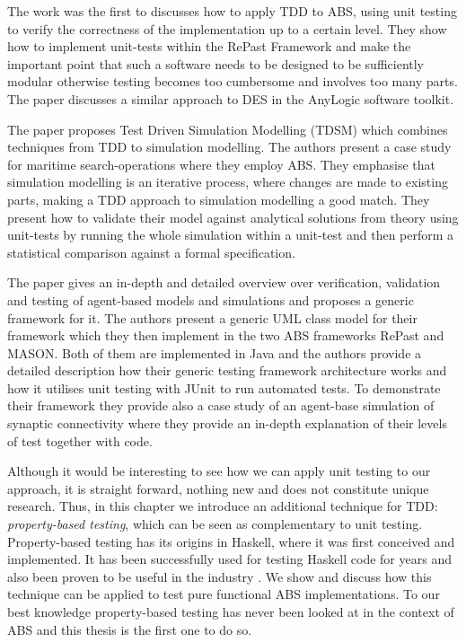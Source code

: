 \medskip

The work \cite{collier_test-driven_2013} was the first to discusses how to apply TDD to ABS, using unit testing to verify the correctness of the implementation up to a certain level. They show how to implement unit-tests within the RePast Framework \cite{north_complex_2013} and make the important point that such a software needs to be designed to be sufficiently modular otherwise testing becomes too cumbersome and involves too many parts. The paper \cite{asta_investigation_2014} discusses a similar approach to DES in the AnyLogic software toolkit. 

The paper \cite{onggo_test-driven_2016} proposes Test Driven Simulation Modelling (TDSM) which combines techniques from TDD to simulation modelling. The authors present a case study for maritime search-operations where they employ ABS. They emphasise that simulation modelling is an iterative process, where changes are made to existing parts, making a TDD approach to simulation modelling a good match. They present how to validate their model against analytical solutions from theory using unit-tests by running the whole simulation within a unit-test and then perform a statistical comparison against a formal specification. %

The paper \cite{gurcan_generic_2013} gives an in-depth and detailed overview over verification, validation and testing of agent-based models and simulations and proposes a generic framework for it. The authors present a generic UML class model for their framework which they then implement in the two ABS frameworks RePast and MASON. Both of them are implemented in Java and the authors provide a detailed description how their generic testing framework architecture works and how it utilises unit testing with JUnit to run automated tests. To demonstrate their framework they provide also a case study of an agent-base simulation of synaptic connectivity where they provide an in-depth explanation of their levels of test together with code.

\medskip

Although it would be interesting to see how we can apply unit testing to our approach, it is straight forward, nothing new and does not constitute unique research. Thus, in this chapter we introduce an additional technique for TDD: \textit{property-based testing}, which can be seen as complementary to unit testing. Property-based testing has its origins \cite{claessen_quickcheck_2000,claessen_testing_2002,runciman_smallcheck_2008} in Haskell, where it was first conceived and implemented. It has been successfully used for testing Haskell code for years and also been proven to be useful in the industry \cite{hughes_quickcheck_2007}. We show and discuss how this technique can be applied to test pure functional ABS implementations. To our best knowledge property-based testing has never been looked at in the context of ABS and this thesis is the first one to do so.

